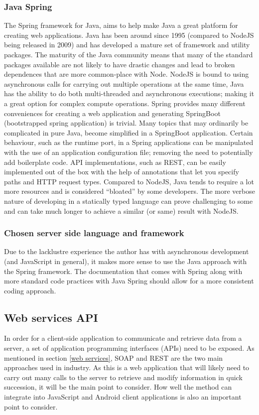 \subsubsection*{Java Spring}
The Spring framework for Java, aims to help make Java a great platform for creating web applications.
Java has been around since 1995 (compared to NodeJS being released in 2009) and has developed a mature set of framework and utility packages.
The maturity of the Java community means that many of the standard packages available are not likely to have drastic changes and lead to 
broken dependences that are more common-place with Node.
NodeJS is bound to using asynchronous calls for carrying out multiple operations at the same time, Java has the ability to do both
multi-threaded and asynchronous executions; making it a great option for complex compute operations.
Spring provides many different conveniences for creating a web application and generating SpringBoot (bootstrapped spring application) is 
trivial.
Many topics that may ordinarily be complicated in pure Java, become simplified in a SpringBoot application.
Certain behaviour, such as the runtime port, in a Spring applications can be manipulated with the use of an application configuration file; removing the need
to potentially add boilerplate code.
API implementations, such as REST, can be easily implemented out of the box with the help of annotations that let you specify paths and HTTP request types.
Compared to NodeJS, Java tends to require a lot more resources and is considered ``bloated'' by some developers.
The more verbose nature of developing in a statically typed language can prove challenging to some and can take much longer to achieve a similar
(or same) result with NodeJS.

\subsubsection*{Chosen server side language and framework}
Due to the lacklustre experience the author has with asynchronous development (and JavaScript in general), it makes more sense to 
use the Java approach with the Spring framework.
The documentation that comes with Spring along with more standard code practices with Java Spring should allow for a more consistent
coding approach.


\subsection{Web services API}
In order for a client-side application to communicate and retrieve data from a server, a set of application programming interfaces (APIs)
need to be exposed. As mentioned in section \ref{web services}, SOAP and REST are the two main approaches used in industry.
As this is a web application that will likely need to carry out many calls to the server to retrieve and modify information in quick
succession, it will be the main point to consider.
How well the method can integrate into JavaScript and Android client applications is also an important point to consider.

